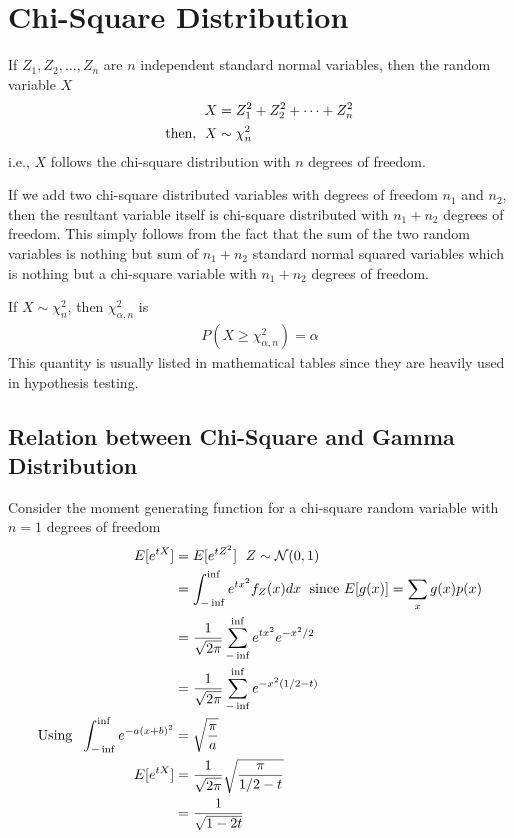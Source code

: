 \documentclass[../probability-notes.tex]{subfiles}
\begin{document}
    \section{Chi-Square Distribution}\label{chi_square}
    If $Z_{1}, Z_{2}, \ldots, Z_{n}$ are $n$ independent standard normal variables, then the random variable $X$
    \begin{align*}
        X &= Z_{1}^{2} + Z_{2}^{2} + \cdots + Z_{n}^{2}\\
        \text{then, \;} X &\sim \chi_{n}^{2} 
    \end{align*}
    i.e., $X$ follows the chi-square distribution with $n$ degrees of freedom.\newline

    If we add two chi-square distributed variables with degrees of freedom $n_{1}$ and $n_{2}$, then the resultant variable itself is chi-square distributed with $n_{1} + n_{2}$ degrees of freedom. This simply follows from the fact that the sum of the two random variables is nothing but sum of $n_{1} + n_{2}$ standard normal squared variables which is nothing but a chi-square variable with $n_{1} + n_{2}$ degrees of freedom.\newline

    If $X \sim \chi_{n}^{2}$, then $\chi_{\alpha, n}^{2}$ is
    \begin{align*}
        P(X \geq \chi_{\alpha, n}^{2}) = \alpha
    \end{align*}
    This quantity is usually listed in mathematical tables since they are heavily used in hypothesis testing.\newline

    \subsection{Relation between Chi-Square and Gamma Distribution}\label{sec:rel_gamma_chi}
    Consider the moment generating function for a chi-square random variable with $n=1$ degrees of freedom
    \begin{align*}
        E[e^{tX}] &= E[e^{tZ^{2}}] \text{\; $Z \sim \mathcal{N}(0, 1)$}\\
        &= \int_{-\inf}^{\inf} e^{tx^{2}} f_{Z}(x) dx \text{\; since $E[g(x)] = \sum_{x} g(x)p(x)$}\\
        &= \frac{1}{\sqrt{2\pi}} \sum_{-\inf}^{\inf} e^{tx^{2}} e^{-x^{2}/2}\\
        &= \frac{1}{\sqrt{2\pi}} \sum_{-\inf}^{\inf} e^{-x^{2}(1/2 - t)}\\
        \text{Using \;} \int_{-\inf}^{\inf} e^{-a(x+b)^{2}} &= \sqrt{\frac{\pi}{a}}\\
        E[e^{tX}] &= \frac{1}{\sqrt{2\pi}} \sqrt{\frac{\pi}{1/2 - t}}\\
        &= \frac{1}{\sqrt{1 - 2t}}
    \end{align*}
\end{document}
